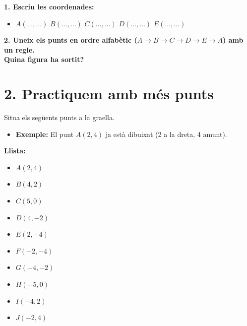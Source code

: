 \documentclass[12pt,a4paper]{article}
\begin{document}
\textbf{1. Escriu les coordenades:}
\begin{itemize}
    \item $A(\dots, \dots)$ \quad $B(\dots, \dots)$ \quad $C(\dots, \dots)$ \quad $D(\dots, \dots)$ \quad $E(\dots, \dots)$
\end{itemize}
\textbf{2. Uneix els punts en ordre alfabètic ($A \to B \to C \to D \to E \to A$) amb un regle.} \\
\textbf{Quina figura ha sortit?} \hrulefill

\newpage

\section*{2. Practiquem amb més punts}
Situa els següents punts a la graella. 
\begin{itemize}
    \item \textbf{Exemple:} El punt $A(2, 4)$ ja està dibuixat (2 a la dreta, 4 amunt).
\end{itemize}

\vspace{0.3cm}

\noindent
\begin{minipage}[t]{0.20\textwidth}
    \vspace{0pt} %
    \textbf{Llista:}
    \begin{itemize}[leftmargin=*]
        \item $A(2, 4)$ \checkmark
        \item $B(4, 2)$
        \item $C(5, 0)$
        \item $D(4, -2)$
        \item $E(2, -4)$
        \item $F(-2, -4)$
        \item $G(-4, -2)$
        \item $H(-5, 0)$
        \item $I(-4, 2)$
        \item $J(-2, 4)$
    \end{itemize}
\end{minipage}%
\hfill
\begin{minipage}[t]{0.75\textwidth}
    \vspace{0pt} %
\end{minipage}
\end{document}

